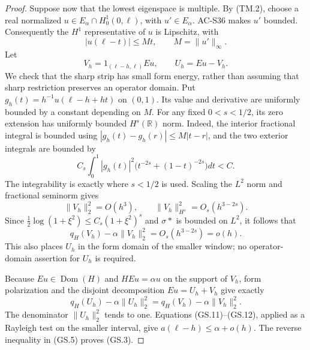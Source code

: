 \begin{proof}
Suppose now that the lowest eigenspace is multiple.
By (TM.2), choose a real normalized
\(u\in E_\alpha\cap H^1_0(0,\ell)\), with
\(u'\in E_\alpha\).  AC-S36 makes \(u'\) bounded.
Consequently the \(H^1\) representative of \(u\) is
Lipschitz, with
\[
                    |u(\ell-t)|\leq M t,
                       \qquad M=\|u'\|_\infty.          \tag{GS.8}
\]
Let
\[
 V_h=1_{(\ell-h,\ell)}Eu,
 \qquad U_h=Eu-V_h.
\]
We check that the sharp strip has small form energy, rather
than assuming that sharp restriction preserves an operator
domain.  Put
\(g_h(t)=h^{-1}u(\ell-h+ht)\) on \((0,1)\).
Its value and derivative are uniformly bounded by a constant
depending on \(M\).  For any fixed \(0<s<1/2\), its zero
extension has uniformly bounded \(H^s(\mathbb R)\) norm.
Indeed, the interior fractional integral is bounded using
\(|g_h(t)-g_h(r)|\leq M|t-r|\), and the two exterior
integrals are bounded by
\[
 C_s\int_0^1 |g_h(t)|^2
                         \bigl(t^{-2s}+(1-t)^{-2s}\bigr)dt< C.
                                                               \tag{GS.9}
\]
The integrability is exactly where \(s<1/2\) is used.
Scaling the \(L^2\) norm and fractional seminorm gives
\[
 \|V_h\|_2^2=O(h^3),\qquad
          \|V_h\|_{H^s}^2=O_s(h^{3-2s}).                \tag{GS.10}
\]
Since \(\tfrac12\log(1+\xi^2)\leq C_s(1+\xi^2)^s\)
and \(\sigma*\) is bounded on \(L^2\), it follows that
\[
             q_H(V_h)-\alpha\|V_h\|_2^2
                                      =O_s(h^{3-2s})=o(h).
                                                               \tag{GS.11}
\]
This also places \(U_h\) in the form domain of the smaller
window; no operator-domain assertion for \(U_h\) is required.

Because \(Eu\in\operatorname{Dom}(H)\) and
\(HEu=\alpha u\) on the support of \(V_h\), form polarization
and the disjoint decomposition \(Eu=U_h+V_h\) give exactly
\[
 q_H(U_h)-\alpha\|U_h\|_2^2
               =q_H(V_h)-\alpha\|V_h\|_2^2.             \tag{GS.12}
\]
The denominator \(\|U_h\|_2^2\) tends to one.
Equations (GS.11)--(GS.12), applied as a Rayleigh test on
the smaller interval, give \(a(\ell-h)\leq\alpha+o(h)\).
The reverse inequality in (GS.5) proves (GS.3).


\end{proof}
